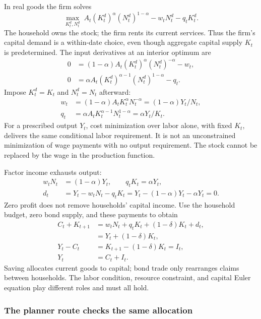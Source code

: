 In real goods the firm solves
\[
\max_{K_t^d,N_t^d}\;
 A_t(K_t^d)^\alpha(N_t^d)^{1-\alpha}-w_tN_t^d-q_tK_t^d.
\]
The household owns the stock; the firm rents its current services. Thus the
firm's capital demand is a within-date choice, even though aggregate capital
supply $K_t$ is predetermined. The input derivatives at an interior optimum are
\begin{align}
0&=(1-\alpha)A_t(K_t^d)^\alpha(N_t^d)^{-\alpha}-w_t,\\
0&=\alpha A_t(K_t^d)^{\alpha-1}(N_t^d)^{1-\alpha}-q_t.
\end{align}
Impose $K_t^d=K_t$ and $N_t^d=N_t$ afterward:
\begin{align}
w_t&=(1-\alpha)A_tK_t^\alpha N_t^{-\alpha}
       =(1-\alpha)Y_t/N_t,\label{eq:rbc-wage}\\
q_t&=\alpha A_tK_t^{\alpha-1}N_t^{1-\alpha}
       =\alpha Y_t/K_t.\label{eq:rbc-rent}
\end{align}
For a prescribed output $Y_t$, cost minimization over labor alone, with fixed
$K_t$, delivers the same conditional labor requirement. It is not an
unconstrained minimization of wage payments with no output requirement.
The stock cannot be replaced by the wage in the production function.

Factor income exhausts output:
\begin{align}
w_tN_t&=(1-\alpha)Y_t,\qquad q_tK_t=\alpha Y_t,\\
d_t&=Y_t-w_tN_t-q_tK_t
 =Y_t-(1-\alpha)Y_t-\alpha Y_t=0.
\end{align}
Zero profit does not remove households' capital income. Use the household
budget, zero bond supply, and these payments to obtain
\begin{align}
C_t+K_{t+1}&=w_tN_t+q_tK_t+(1-\delta)K_t+d_t,\\
 &=Y_t+(1-\delta)K_t,\\
Y_t-C_t&=K_{t+1}-(1-\delta)K_t=I_t,\\
Y_t&=C_t+I_t.\label{eq:rbc-resources}
\end{align}
Saving allocates current goods to capital; bond trade only rearranges claims
between households. The labor condition, resource constraint, and capital
Euler equation play different roles and must all hold.

\subsubsection{The planner route checks the same allocation}

